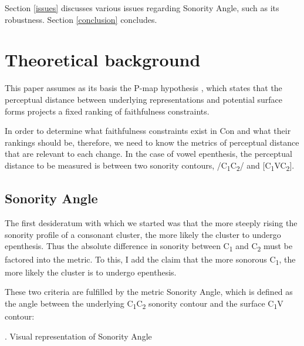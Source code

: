 \documentclass[12pt]{article}
\begin{document}
Section \ref{issues} discusses various issues regarding {\sc Sonority Angle}, such as its robustness. Section \ref{conclusion} concludes.

\section{Theoretical background} \label{theoreticalmachinery}

This paper assumes as its basis the P-map hypothesis \citep{steriade.2001}, which states that the perceptual distance between underlying representations and potential surface forms projects a fixed ranking of faithfulness constraints.

In order to determine what faithfulness constraints exist in {\sc Con} and what their rankings should be, therefore, we need to know the metrics of perceptual distance that are relevant to each change. In the case of vowel epenthesis, the perceptual distance to be measured is between two sonority contours, /C\textsubscript{1}C\textsubscript{2}/ and [C\textsubscript{1}VC\textsubscript{2}].

\subsection{Sonority Angle}

The first desideratum with which we started was that the more steeply rising the sonority profile of a consonant cluster, the more likely the cluster to undergo epenthesis. Thus the absolute difference in sonority between C\textsubscript{1} and C\textsubscript{2} must be factored into the metric. To this, I add the claim that the more sonorous C\textsubscript{1}, the more likely the cluster is to undergo epenthesis.

These two criteria are fulfilled by the metric {\sc Sonority Angle}, which is defined as the angle between the underlying C\textsubscript{1}C\textsubscript{2} sonority contour and the surface C\textsubscript{1}V contour:

\ex. Visual representation of {\sc Sonority Angle} \label{sonangle_picture} 

\vspace{-3em}
\begin{center}
\end{center}
\end{document}
